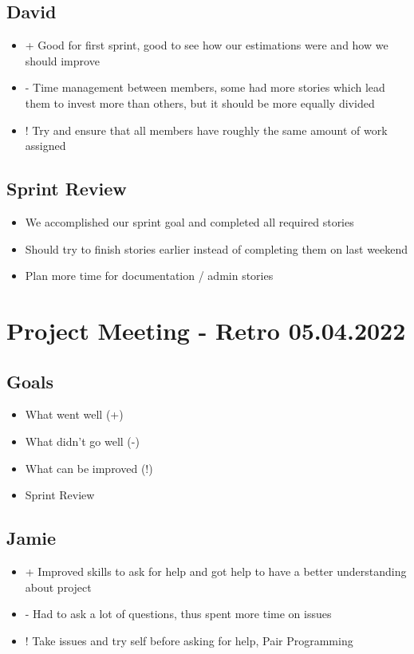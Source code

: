 \subsection{David}
\begin{itemize}
    \item + Good for first sprint, good to see how our estimations were and how we should improve
    \item - Time management between members, some had more stories which lead them to invest more than others, but it should be more equally divided
    \item ! Try and ensure that all members have roughly the same amount of work assigned
\end{itemize}

\subsection{Sprint Review}
\begin{itemize}
    \item We accomplished our sprint goal and completed all required stories
    \item Should try to finish stories earlier instead of completing them on last weekend
    \item Plan more time for documentation / admin stories
\end{itemize}

\section{Project Meeting - Retro 05.04.2022}

\subsection{Goals}
\begin{itemize}
    \item What went well (+)
    \item What didn't go well (-)
    \item What can be improved (!)
    \item Sprint Review
\end{itemize}

\subsection{Jamie}
\begin{itemize}
    \item + Improved skills to ask for help and got help to have a better understanding about project
    \item - Had to ask a lot of questions, thus spent more time on issues
    \item ! Take issues and try self before asking for help, Pair Programming
\end{itemize}

